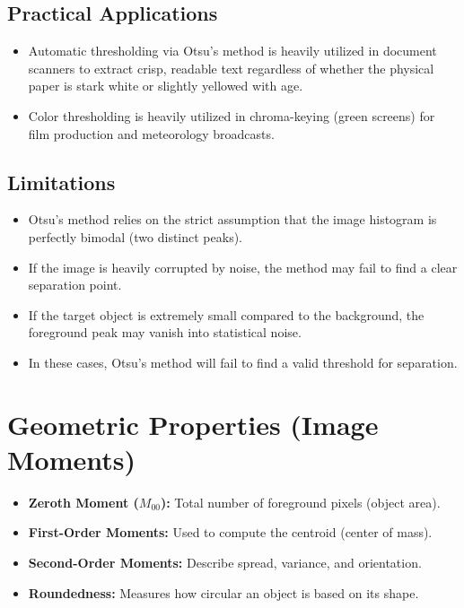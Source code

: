 \documentclass[12pt]{article}
\begin{document}
\subsection{Practical Applications}
\begin{itemize}
    \item Automatic thresholding via Otsu's method is heavily utilized in document scanners to extract crisp, readable text regardless of whether the physical paper is stark white or slightly yellowed with age.

    \item Color thresholding is heavily utilized in chroma-keying (green screens) for film production and meteorology broadcasts.
\end{itemize}

\subsection{Limitations}
\begin{itemize}
    \item Otsu's method relies on the strict assumption that the image histogram is perfectly bimodal (two distinct peaks).

    \item If the image is heavily corrupted by noise, the method may fail to find a clear separation point.

    \item If the target object is extremely small compared to the background, the foreground peak may vanish into statistical noise.

    \item In these cases, Otsu's method will fail to find a valid threshold for separation.
\end{itemize}


\section{Geometric Properties (Image Moments)}
\begin{itemize}
    \item \textbf{Zeroth Moment ($M_{00}$):} Total number of foreground pixels (object area).
    \item \textbf{First-Order Moments:} Used to compute the centroid (center of mass).
    \item \textbf{Second-Order Moments:} Describe spread, variance, and orientation.
    \item \textbf{Roundedness:} Measures how circular an object is based on its shape.
\end{itemize}
\end{document}
